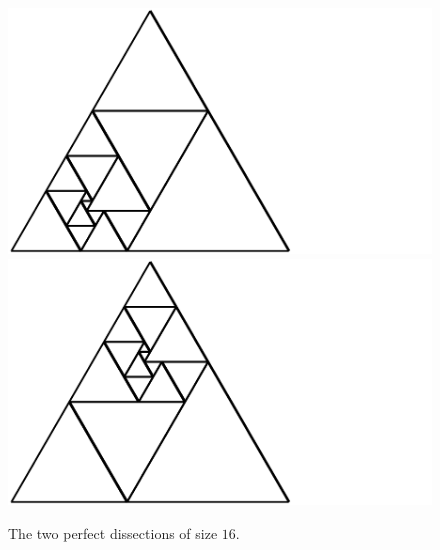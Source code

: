 \documentclass[12pt,amstags,fleqn]{article}
\theoremstyle{plain}
\theoremstyle{definition}
\begin{document}
\begin{figure}[htbp]
\begin{center}
\includegraphics{output-dissections-perfect-dissection16_i128609_r5_c0.pdf}\includegraphics{output-dissections-perfect-dissection16_i129387_r1_c3.pdf} 
\end{center}
\caption{The two perfect dissections of size $16$.}
\label{figPerfect16}
\end{figure}
%
\end{document}
